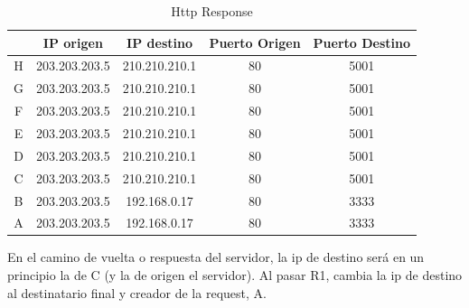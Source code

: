 \begin{table}[H]
    \centering
    \begin{tabular}{c|c|c|c|c}
         & IP origen & IP destino & Puerto Origen & Puerto Destino \\
         \hline
         \hline
        H & 203.203.203.5 & 210.210.210.1 & 80 & 5001 \\
        G &  203.203.203.5 & 210.210.210.1 & 80 & 5001 \\
        F &  203.203.203.5 & 210.210.210.1 & 80 & 5001 \\
        E &  203.203.203.5 & 210.210.210.1 & 80 & 5001 \\
        D &  203.203.203.5 & 210.210.210.1 & 80 & 5001 \\
        C &  203.203.203.5 & 210.210.210.1 & 80 & 5001 \\
        B &  203.203.203.5 & 192.168.0.17 & 80 & 3333 \\
        A &  203.203.203.5 & 192.168.0.17 & 80 & 3333\\
    \end{tabular}
    \caption{Http Response}
    \label{tab:my_label}
\end{table}

En el camino de vuelta o respuesta del servidor, la ip de destino será en un principio la de C (y la de origen el servidor). Al pasar R1, cambia la ip de destino al destinatario final y creador de la request, A.